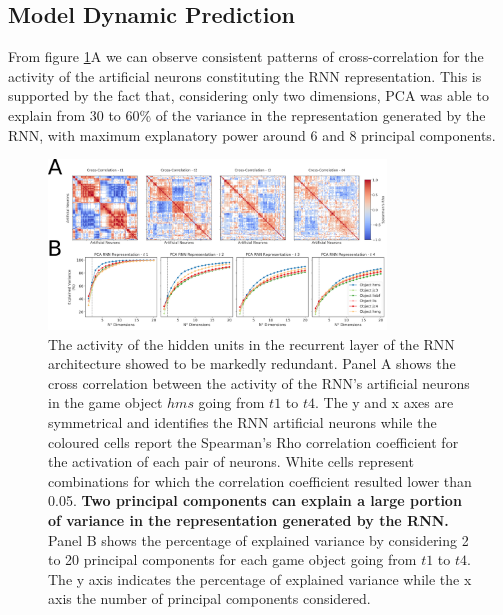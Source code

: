 \subsection{Model Dynamic Prediction}
From figure \ref{pca_emb}A we can observe consistent patterns of cross-correlation for the activity of the artificial neurons constituting the RNN representation. This is supported by the fact that, considering only two dimensions, PCA was able to explain from 30 to 60\% of the variance in the representation generated by the RNN, with maximum explanatory power around 6 and 8 principal components.
\begin{figure}[h]
\centering
\includegraphics[width=0.8\textwidth]{images/chapter_4/pca_repr_42.png}
\caption[\textbf{Hidden units activation analysis of the RNN architecture}]{The activity of the hidden units in the recurrent layer of the RNN architecture showed to be markedly redundant. Panel A shows the cross correlation between the activity of the RNN's artificial neurons in the game object $hms$ going from $t1$ to $t4$. The y and x axes are symmetrical and identifies the RNN artificial neurons while the coloured cells report the Spearman's Rho correlation coefficient for the activation of each pair of neurons. White cells represent combinations for which the correlation coefficient resulted lower than 0.05. \textbf{Two principal components can explain a large portion of variance in the representation generated by the RNN.} Panel B shows the percentage of explained variance by considering 2 to 20 principal components for each game object going from $t1$ to $t4$. The y axis indicates the percentage of explained variance while the x axis the number of principal components considered.}
\label{pca_emb} 
\end{figure}


